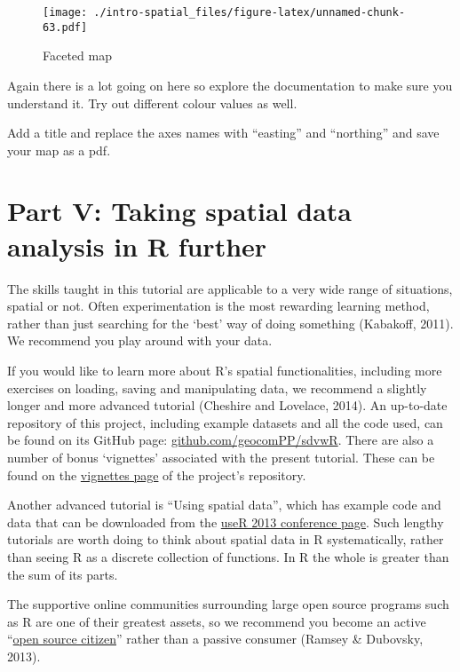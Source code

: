 \documentclass[]{article}
\begin{document}
\begin{figure}[htbp]
\centering
\texttt{[image: ./intro-spatial\_files/figure-latex/unnamed-chunk-63.pdf]}
\caption{Faceted map}
\end{figure}

Again there is a lot going on here so explore the documentation to make
sure you understand it. Try out different colour values as well.

Add a title and replace the axes names with ``easting'' and ``northing''
and save your map as a pdf.

\section{Part V: Taking spatial data analysis in R
further}\label{part-v-taking-spatial-data-analysis-in-r-further}

The skills taught in this tutorial are applicable to a very wide range
of situations, spatial or not. Often experimentation is the most
rewarding learning method, rather than just searching for the `best' way
of doing something (Kabakoff, 2011). We recommend you play around with
your data.

If you would like to learn more about R's spatial functionalities,
including more exercises on loading, saving and manipulating data, we
recommend a slightly longer and more advanced tutorial (Cheshire and
Lovelace, 2014). An up-to-date repository of this project, including
example datasets and all the code used, can be found on its GitHub page:
\href{https://github.com/geocomPP/sdvwR}{github.com/geocomPP/sdvwR}.
There are also a number of bonus `vignettes' associated with the present
tutorial. These can be found on the
\href{https://github.com/Robinlovelace/Creating-maps-in-R/tree/master/vignettes}{vignettes
page} of the project's repository.

Another advanced tutorial is ``Using spatial data'', which has example
code and data that can be downloaded from the
\href{http://www.edii.uclm.es/~useR-2013//Tutorials/Bivand.html}{useR
2013 conference page}. Such lengthy tutorials are worth doing to think
about spatial data in R systematically, rather than seeing R as a
discrete collection of functions. In R the whole is greater than the sum
of its parts.

The supportive online communities surrounding large open source programs
such as R are one of their greatest assets, so we recommend you become
an active
``\href{http://blog.cleverelephant.ca/2013/10/being-open-source-citizen.html}{open
source citizen}'' rather than a passive consumer (Ramsey \& Dubovsky,
2013).
\end{document}

